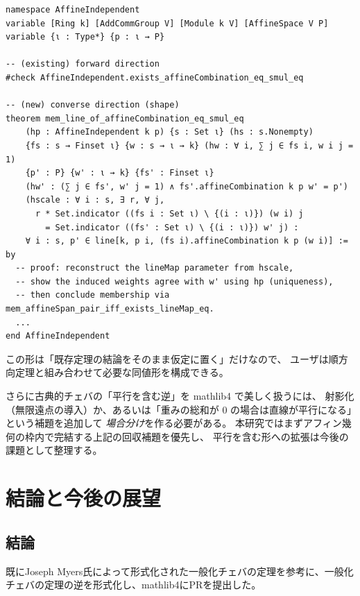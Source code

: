 \documentclass[a4paper,12pt]{bxjsbook}
\newlength{\customindent}
\newenvironment{body}{
  \par
  \begingroup
  \setlength{\leftskip}{\customindent}
  \setlength{\rightskip}{0pt}
  \setlength{\parindent}{1em}
  \setlength{\displayindent}{\customindent}
  \setlength{\displaywidth}{\dimexpr\linewidth-\customindent\relax}
}{
  \par
  \endgroup
}
\theoremstyle{theorem}
\begin{document}
\begin{verbatim}
namespace AffineIndependent
variable [Ring k] [AddCommGroup V] [Module k V] [AffineSpace V P]
variable {ι : Type*} {p : ι → P}

-- (existing) forward direction
#check AffineIndependent.exists_affineCombination_eq_smul_eq

-- (new) converse direction (shape)
theorem mem_line_of_affineCombination_eq_smul_eq
    (hp : AffineIndependent k p) {s : Set ι} (hs : s.Nonempty)
    {fs : s → Finset ι} {w : s → ι → k} (hw : ∀ i, ∑ j ∈ fs i, w i j = 1)
    {p' : P} {w' : ι → k} {fs' : Finset ι}
    (hw' : (∑ j ∈ fs', w' j = 1) ∧ fs'.affineCombination k p w' = p')
    (hscale : ∀ i : s, ∃ r, ∀ j,
      r * Set.indicator ((fs i : Set ι) \ {(i : ι)}) (w i) j
        = Set.indicator ((fs' : Set ι) \ {(i : ι)}) w' j) :
    ∀ i : s, p' ∈ line[k, p i, (fs i).affineCombination k p (w i)] := by
  -- proof: reconstruct the lineMap parameter from hscale,
  -- show the induced weights agree with w' using hp (uniqueness),
  -- then conclude membership via mem_affineSpan_pair_iff_exists_lineMap_eq.
  ...
end AffineIndependent
\end{verbatim}

    \begin{body}
        \indent この形は「既存定理の結論をそのまま仮定に置く」だけなので、
        ユーザは順方向定理と組み合わせて必要な同値形を構成できる。

        \indent さらに古典的チェバの「平行を含む逆」を mathlib4 で美しく扱うには、
        射影化（無限遠点の導入）か、あるいは「重みの総和が $0$ の場合は直線が平行になる」という補題を追加して
        \emph{場合分け}を作る必要がある。
        本研究ではまずアフィン幾何の枠内で完結する上記の回収補題を優先し、
        平行を含む形への拡張は今後の課題として整理する。
    \end{body}


    \chapter{結論と今後の展望}

    \section{結論}
    \begin{body}
        \indent 既にJoseph Myers氏によって形式化された一般化チェバの定理を参考に、一般化チェバの定理の逆を形式化し、mathlib4にPRを提出した。
    \end{body}
\end{document}
